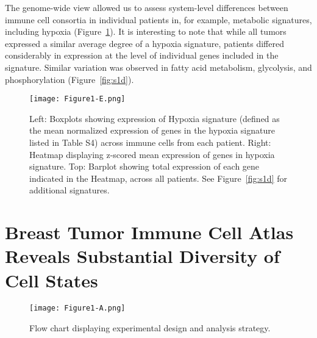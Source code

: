 
The genome-wide view allowed us to assess system-level differences between immune cell consortia in individual patients in, for example, metabolic signatures, including hypoxia (Figure~\ref{fig:1e}).
It is interesting to note that while all tumors expressed a similar average degree of a hypoxia signature, patients differed considerably in expression at the level of individual genes included in the signature.
Similar variation was observed in fatty acid metabolism, glycolysis, and phosphorylation (Figure~\ref{fig:s1d}).

\begin{figure}
\centering
\texttt{[image: Figure1-E.png]}
\caption{Left: Boxplots showing expression of Hypoxia signature (defined as the mean normalized expression of genes in the hypoxia signature listed in Table S4) across immune cells from each patient.
  Right: Heatmap displaying z-scored mean expression of genes in hypoxia signature.
  Top: Barplot showing total expression of each gene indicated in the Heatmap, across all patients.
  See Figure~\ref{fig:s1d} for additional signatures.
}
\label{fig:1e}
\end{figure}

\section{Breast Tumor Immune Cell Atlas Reveals Substantial Diversity of Cell States}

\begin{figure}
\centering
\texttt{[image: Figure1-A.png]}
\caption{Flow chart displaying experimental design and analysis strategy.}
\label{fig:1a}
\end{figure} %

